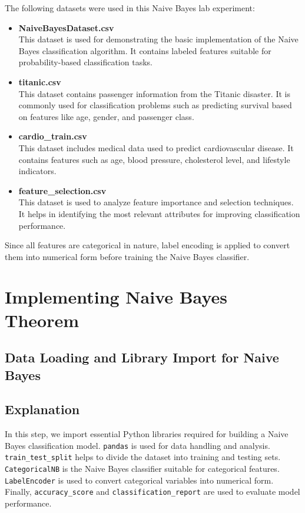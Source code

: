 \documentclass[11pt,a4paper]{report}
\begin{document}
The following datasets were used in this Naive Bayes lab experiment:

\begin{itemize}
    \item \textbf{NaiveBayesDataset.csv} \\
    This dataset is used for demonstrating the basic implementation of the Naive Bayes classification algorithm. It contains labeled features suitable for probability-based classification tasks.

    \item \textbf{titanic.csv} \\
    This dataset contains passenger information from the Titanic disaster. It is commonly used for classification problems such as predicting survival based on features like age, gender, and passenger class.

    \item \textbf{cardio\_train.csv} \\
    This dataset includes medical data used to predict cardiovascular disease. It contains features such as age, blood pressure, cholesterol level, and lifestyle indicators.

    \item \textbf{feature\_selection.csv} \\
    This dataset is used to analyze feature importance and selection techniques. It helps in identifying the most relevant attributes for improving classification performance.
\end{itemize}

Since all features are categorical in nature, label encoding is applied to convert them into numerical form before training the Naive Bayes classifier.    

    
\section{Implementing Naive Bayes
Theorem}\label{implementing-naive-bayes-theorem}

\subsection{Data Loading and Library Import for Naive Bayes}

\subsection*{Explanation}

In this step, we import essential Python libraries required for building a Naive Bayes classification model. 
\texttt{pandas} is used for data handling and analysis. \texttt{train\_test\_split} helps to divide the dataset into training and testing sets. 
\texttt{CategoricalNB} is the Naive Bayes classifier suitable for categorical features. 
\texttt{LabelEncoder} is used to convert categorical variables into numerical form. 
Finally, \texttt{accuracy\_score} and \texttt{classification\_report} are used to evaluate model performance.
\end{document}
